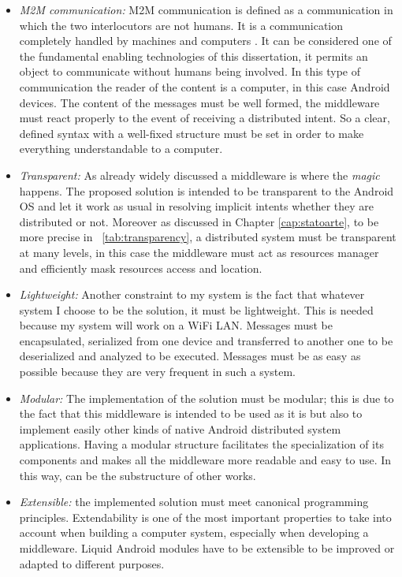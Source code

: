 \begin{itemize}
	\item \textit{M2M communication:} M2M communication is defined as a communication in which the two interlocutors are not humans. It is a communication completely handled by machines and computers \cite{cha2009trust}. It can be considered one of the fundamental enabling technologies of this dissertation, it permits an object to communicate without humans being involved. In this type of communication the reader of the content is a computer, in this case Android devices. The content of the messages must be well formed, the middleware must react properly to the event of receiving a distributed intent. So a clear, defined syntax with a well-fixed structure must be set in order to make everything understandable to a computer.
	
	\item \textit{Transparent:} As already widely discussed a middleware is where the \textit{magic} happens. The proposed solution is intended to be transparent to the Android OS and let it work as usual in resolving implicit intents whether they are distributed or not. Moreover as discussed in Chapter \ref{cap:statoarte}, to be more precise in \tablename~\ref{tab:transparency}, a distributed system must be transparent at many levels, in this case the middleware must act as resources manager and efficiently mask resources access and location.
	
	
	\item \textit{Lightweight:} Another constraint to my system is the fact that whatever system I choose to be the solution, it must be lightweight. This is needed because my system will work on a WiFi LAN. Messages must be encapsulated, serialized from one device and transferred to another one to be deserialized and analyzed to be executed. Messages must be as easy as possible because they are very frequent in such a system.
	
	\item \textit{Modular:} The implementation of the solution must be modular; this is due to the fact that this middleware is intended to be used as it is but also to implement easily other kinds of native Android distributed system applications. Having a modular structure facilitates the specialization of its components and makes all the middleware more readable and easy to use. In this way,  can be the substructure of other works.
	
	\item \textit{Extensible:} the implemented solution must meet canonical programming principles. Extendability is one of the most important properties to take into account when building a computer system, especially when developing a middleware. Liquid Android modules have to be extensible to be improved or adapted to different purposes.
		

\end{itemize}
